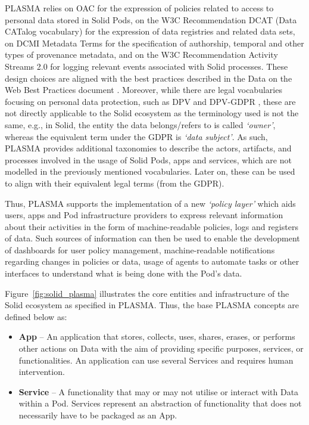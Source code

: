 PLASMA relies on OAC for the expression of policies related to access to personal data stored in Solid Pods, on the W3C Recommendation DCAT (Data CATalog vocabulary) \citep{albertoni_data_2020} for the expression of data registries and related data sets, on DCMI Metadata Terms \citep{dcmi_usage_board_dcmi_2020} for the specification of authorship, temporal and other types of provenance metadata, and on the W3C Recommendation Activity Streams 2.0 \citep{snell_activity_2017} for logging relevant events associated with Solid processes.
These design choices are aligned with the best practices described in the Data on the Web Best Practices document \citep{loscio_data_2017}.
Moreover, while there are legal vocabularies focusing on personal data protection, such as DPV and DPV-GDPR \citep{panetto_creating_2019}, these are not directly applicable to the Solid ecosystem as the terminology used is not the same, e.g., in Solid, the entity the data belongs/refers to is called \textit{`owner'}, whereas the equivalent term under the GDPR is \textit{`data subject'}.
As such, PLASMA provides additional taxonomies to describe the actors, artifacts, and processes involved in the usage of Solid Pods, apps and services, which are not modelled in the previously mentioned vocabularies.
Later on, these can be used to align with their equivalent legal terms (from the GDPR).

Thus, PLASMA supports the implementation of a new \textit{`policy layer'} which aids users, apps and Pod infrastructure providers to express relevant information about their activities in the form of machine-readable policies, logs and registers of data.
Such sources of information can then be used to enable the development of dashboards for user policy management, machine-readable notifications regarding changes in policies or data, usage of agents to automate tasks or other interfaces to understand what is being done with the Pod's data.

Figure~\ref{fig:solid_plasma} illustrates the core entities and infrastructure of the Solid ecosystem as specified in PLASMA.
Thus, the base PLASMA concepts are defined below as:

\begin{itemize}
    \item \textbf{App} -- An application that stores, collects, uses, shares, erases, or performs other actions on Data with the aim of providing specific purposes, services, or functionalities. An application can use several Services and requires human intervention.
    \item \textbf{Service} -- A functionality that may or may not utilise or interact with Data within a Pod. Services represent an abstraction of functionality that does not necessarily have to be packaged as an App.
\end{itemize}

